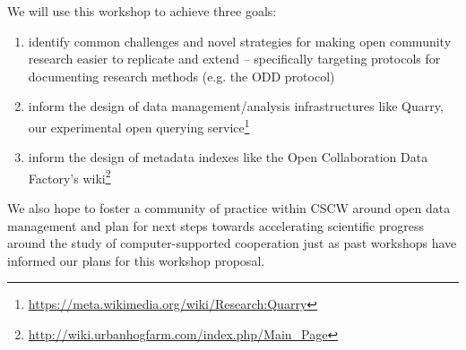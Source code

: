 We will use this workshop to achieve three goals:
\begin{enumerate}
\item identify common challenges and novel strategies for making open community research easier to replicate and extend -- specifically targeting protocols for documenting research methods (e.g. the ODD protocol\cite{grimm10odd})
\item inform the design of data management/analysis infrastructures like Quarry, our experimental open querying service\footnote{\url{https://meta.wikimedia.org/wiki/Research:Quarry}}
\item inform the design of metadata indexes like the Open Collaboration Data Factory's wiki\footnote{\url{http://wiki.urbanhogfarm.com/index.php/Main_Page}}
\end{enumerate}

We also hope to foster a community of practice within CSCW around open data management and plan for next steps towards accelerating scientific progress around the study of computer-supported cooperation just as past workshops have informed our plans for this workshop proposal.
